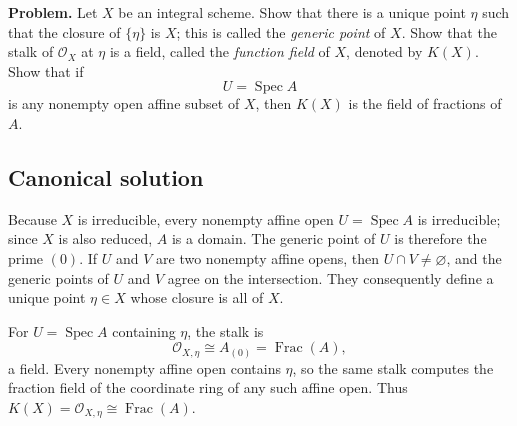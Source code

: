 
\textbf{Problem.}
Let \(X\) be an integral scheme. Show that there is a unique point \(\eta\) such that the closure of \(\{\eta\}\) is \(X\); this is called the \emph{generic point} of \(X\). Show that the stalk of \(\mathcal{O}_X\) at \(\eta\) is a field, called the \emph{function field} of \(X\), denoted by \(K(X)\). Show that if
\[
U=\operatorname{Spec} A
\]
is any nonempty open affine subset of \(X\), then \(K(X)\) is the field of fractions of \(A\).

\bigskip

\subsection*{Canonical solution}
Because $X$ is irreducible, every nonempty affine open $U=\operatorname{Spec} A$ is irreducible; since $X$ is also reduced, $A$ is a domain. The generic point of $U$ is therefore the prime $(0)$. If $U$ and $V$ are two nonempty affine opens, then $U\cap V\neq\varnothing$, and the generic points of $U$ and $V$ agree on the intersection. They consequently define a unique point $\eta\in X$ whose closure is all of $X$.

For $U=\operatorname{Spec} A$ containing $\eta$, the stalk is
\[
\mathcal O_{X,\eta}\cong A_{(0)}=\operatorname{Frac}(A),
\]
a field. Every nonempty affine open contains $\eta$, so the same stalk computes the fraction field of the coordinate ring of any such affine open. Thus $K(X)=\mathcal O_{X,\eta}\cong\operatorname{Frac}(A)$.
